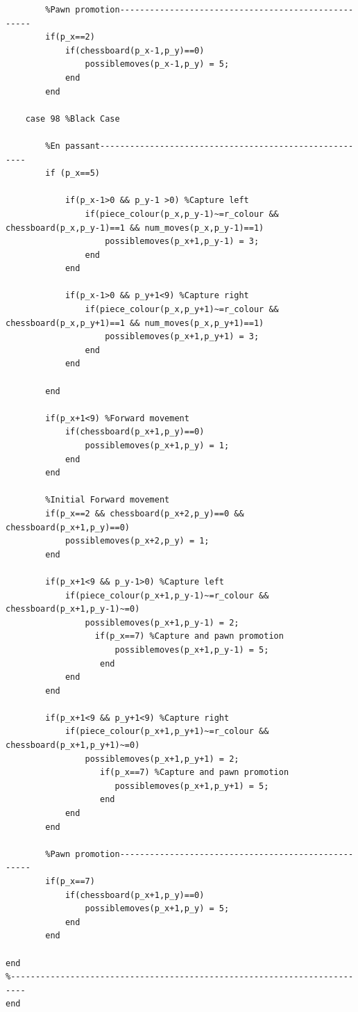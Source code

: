 \documentclass[11pt,a4paper]{article}
\begin{document}
\begin{lstlisting}
        %Pawn promotion----------------------------------------------------
        if(p_x==2) 
            if(chessboard(p_x-1,p_y)==0)
                possiblemoves(p_x-1,p_y) = 5;
            end
        end
       
    case 98 %Black Case
    
        %En passant-------------------------------------------------------
        if (p_x==5)
            
            if(p_x-1>0 && p_y-1 >0) %Capture left
                if(piece_colour(p_x,p_y-1)~=r_colour && chessboard(p_x,p_y-1)==1 && num_moves(p_x,p_y-1)==1)
                    possiblemoves(p_x+1,p_y-1) = 3;
                end
            end

            if(p_x-1>0 && p_y+1<9) %Capture right
                if(piece_colour(p_x,p_y+1)~=r_colour && chessboard(p_x,p_y+1)==1 && num_moves(p_x,p_y+1)==1)
                    possiblemoves(p_x+1,p_y+1) = 3;
                end    
            end
        
        end
        
        if(p_x+1<9) %Forward movement
            if(chessboard(p_x+1,p_y)==0) 
                possiblemoves(p_x+1,p_y) = 1;
            end
        end

        %Initial Forward movement
        if(p_x==2 && chessboard(p_x+2,p_y)==0 && chessboard(p_x+1,p_y)==0)
            possiblemoves(p_x+2,p_y) = 1;
        end
        
        if(p_x+1<9 && p_y-1>0) %Capture left
            if(piece_colour(p_x+1,p_y-1)~=r_colour && chessboard(p_x+1,p_y-1)~=0)
                possiblemoves(p_x+1,p_y-1) = 2;
                  if(p_x==7) %Capture and pawn promotion
                      possiblemoves(p_x+1,p_y-1) = 5;
                   end
            end
        end
        
        if(p_x+1<9 && p_y+1<9) %Capture right
            if(piece_colour(p_x+1,p_y+1)~=r_colour && chessboard(p_x+1,p_y+1)~=0)
                possiblemoves(p_x+1,p_y+1) = 2;
                   if(p_x==7) %Capture and pawn promotion
                      possiblemoves(p_x+1,p_y+1) = 5;
                   end
            end   
        end
        
        %Pawn promotion----------------------------------------------------
        if(p_x==7)
            if(chessboard(p_x+1,p_y)==0) 
                possiblemoves(p_x+1,p_y) = 5;
            end
        end
   
end
%-------------------------------------------------------------------------
end
\end{lstlisting}
\end{document}
